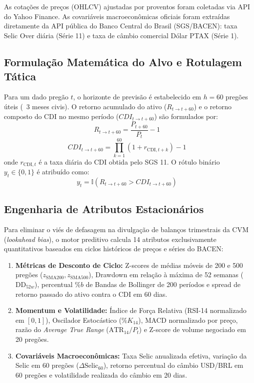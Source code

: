 \documentclass[conference]{IEEEtran}
\begin{document}
As cotações de preços (OHLCV) ajustadas por proventos foram coletadas via API do Yahoo Finance. As covariáveis macroeconômicas oficiais foram extraídas diretamente da API pública do Banco Central do Brasil (SGS/BACEN): taxa Selic Over diária (Série 11) e taxa de câmbio comercial Dólar PTAX (Série 1).

\subsection{Formulação Matemática do Alvo e Rotulagem Tática}
Para um dado pregão $t$, o horizonte de previsão é estabelecido em $h = 60$ pregões úteis (~3 meses civis). O retorno acumulado do ativo ($R_{t \to t+60}$) e o retorno composto do CDI no mesmo período ($CDI_{t \to t+60}$) são formulados por:
\begin{equation}
R_{t \to t+60} = \frac{P_{t+60}}{P_t} - 1
\end{equation}
\begin{equation}
CDI_{t \to t+60} = \prod_{k=1}^{60} \left(1 + r_{\text{CDI}, t+k}\right) - 1
\end{equation}
onde $r_{\text{CDI}, t}$ é a taxa diária do CDI obtida pelo SGS 11. O rótulo binário $y_t \in \{0, 1\}$ é atribuído como:
\begin{equation}
y_t = \mathbb{I}\left(R_{t \to t+60} > CDI_{t \to t+60}\right)
\end{equation}

\subsection{Engenharia de Atributos Estacionários}
Para eliminar o viés de defasagem na divulgação de balanços trimestrais da CVM (\textit{lookahead bias}), o motor preditivo calcula 14 atributos exclusivamente quantitativos baseados em ciclos históricos de preços e séries do BACEN:
\begin{enumerate}
    \item \textbf{Métricas de Desconto de Ciclo:} Z-scores de médias móveis de 200 e 500 pregões ($z_{\text{SMA200}}, z_{\text{SMA500}}$), Drawdown em relação à máxima de 52 semanas ($\text{DD}_{52w}$), percentual $\%b$ de Bandas de Bollinger de 200 períodos e spread de retorno passado do ativo contra o CDI em 60 dias.
    \item \textbf{Momentum e Volatilidade:} Índice de Força Relativa (RSI-14 normalizado em $[0, 1]$), Oscilador Estocástico ($\%K_{14}$), MACD normalizado por preço, razão do \textit{Average True Range} ($\text{ATR}_{14} / P_t$) e Z-score de volume negociado em 20 pregões.
    \item \textbf{Covariáveis Macroeconômicas:} Taxa Selic anualizada efetiva, variação da Selic em 60 pregões ($\Delta \text{Selic}_{60}$), retorno percentual do câmbio USD/BRL em 60 pregões e volatilidade realizada do câmbio em 20 dias.
\end{enumerate}
\end{document}
